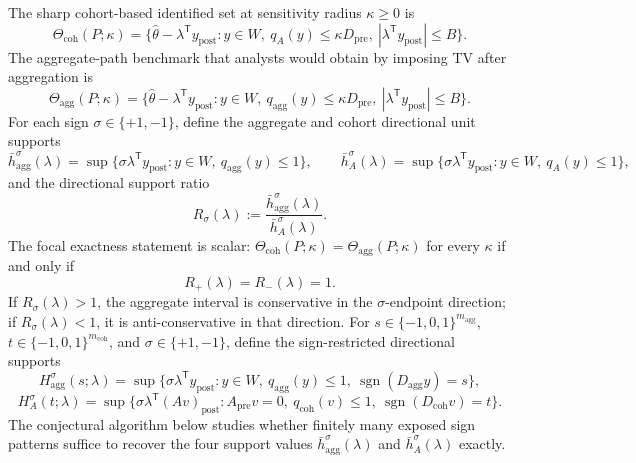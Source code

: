 \documentclass[11pt]{article}
\newcommand{\transpose}{\mathsf{T}}
\theoremstyle{definition}
\theoremstyle{plain}
\theoremstyle{remark}
\begin{document}
The sharp cohort-based identified set at sensitivity radius \(\kappa\ge 0\) is
\[
\Theta_{\mathrm{coh}}(P;\kappa)
=
\{\hat\theta-\lambda^\transpose y_{\mathrm{post}}:
 y\in W,\ q_A(y)\le \kappa D_{\mathrm{pre}},\
 |\lambda^\transpose y_{\mathrm{post}}|\le B\}.
\]
The aggregate-path benchmark that analysts would obtain by imposing TV after aggregation is
\[
\Theta_{\mathrm{agg}}(P;\kappa)
=
\{\hat\theta-\lambda^\transpose y_{\mathrm{post}}:
 y\in W,\ q_{\mathrm{agg}}(y)\le \kappa D_{\mathrm{pre}},\
 |\lambda^\transpose y_{\mathrm{post}}|\le B\}.
\]
For each sign \(\sigma\in\{+1,-1\}\), define the aggregate and cohort directional unit supports
\[
\bar h_{\mathrm{agg}}^\sigma(\lambda)
=
\sup\{\sigma\lambda^\transpose y_{\mathrm{post}}: y\in W,\ q_{\mathrm{agg}}(y)\le 1\},
\qquad
\bar h_A^\sigma(\lambda)
=
\sup\{\sigma\lambda^\transpose y_{\mathrm{post}}: y\in W,\ q_A(y)\le 1\},
\]
and the directional support ratio
\[
R_\sigma(\lambda)
:=
\frac{\bar h_{\mathrm{agg}}^\sigma(\lambda)}{\bar h_A^\sigma(\lambda)}.
\]
The focal exactness statement is scalar: \(\Theta_{\mathrm{coh}}(P;\kappa)=\Theta_{\mathrm{agg}}(P;\kappa)\) for every \(\kappa\) if and only if
\[
R_+(\lambda)=R_-(\lambda)=1.
\]
If \(R_\sigma(\lambda)>1\), the aggregate interval is conservative in the \(\sigma\)-endpoint direction; if \(R_\sigma(\lambda)<1\), it is anti-conservative in that direction. For \(s\in\{-1,0,1\}^{m_{\mathrm{agg}}}\), \(t\in\{-1,0,1\}^{m_{\mathrm{coh}}}\), and \(\sigma\in\{+1,-1\}\), define the sign-restricted directional supports
\[
H_{\mathrm{agg}}^\sigma(s;\lambda)
=
\sup\{\sigma\lambda^\transpose y_{\mathrm{post}}:
y\in W,\ q_{\mathrm{agg}}(y)\le 1,\ \operatorname{sgn}(D_{\mathrm{agg}}y)=s\},
\]
\[
H_A^\sigma(t;\lambda)
=
\sup\{\sigma\lambda^\transpose (Av)_{\mathrm{post}}:
A_{\mathrm{pre}}v=0,\ q_{\mathrm{coh}}(v)\le 1,\ \operatorname{sgn}(D_{\mathrm{coh}}v)=t\}.
\]
The conjectural algorithm below studies whether finitely many exposed sign patterns suffice to recover the four support values \(\bar h_{\mathrm{agg}}^\sigma(\lambda)\) and \(\bar h_A^\sigma(\lambda)\) exactly.
\end{document}
